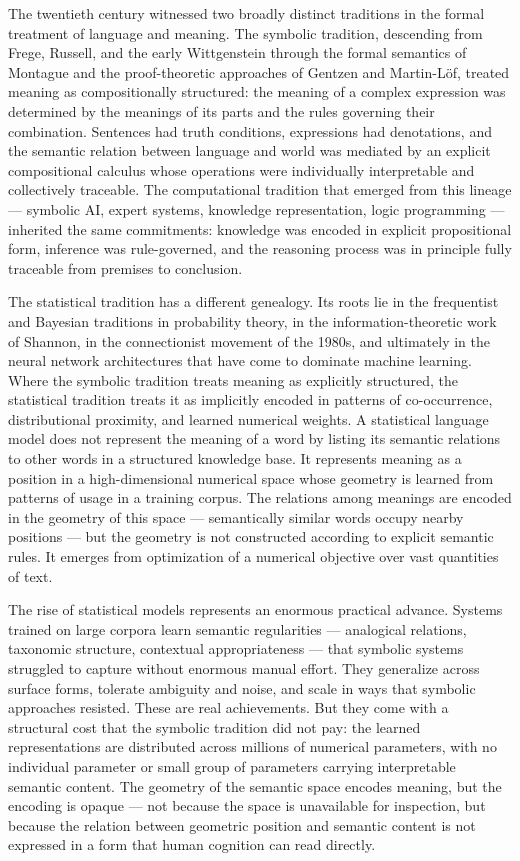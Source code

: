 \documentclass[12pt,openany]{book}
\theoremstyle{plain}
\theoremstyle{definition}
\theoremstyle{remark}
\begin{document}
The twentieth century witnessed two broadly distinct traditions in the formal treatment of language and meaning. The symbolic tradition, descending from Frege, Russell, and the early Wittgenstein through the formal semantics of Montague and the proof-theoretic approaches of Gentzen and Martin-Löf, treated meaning as compositionally structured: the meaning of a complex expression was determined by the meanings of its parts and the rules governing their combination. Sentences had truth conditions, expressions had denotations, and the semantic relation between language and world was mediated by an explicit compositional calculus whose operations were individually interpretable and collectively traceable. The computational tradition that emerged from this lineage — symbolic AI, expert systems, knowledge representation, logic programming — inherited the same commitments: knowledge was encoded in explicit propositional form, inference was rule-governed, and the reasoning process was in principle fully traceable from premises to conclusion.

The statistical tradition has a different genealogy. Its roots lie in the frequentist and Bayesian traditions in probability theory, in the information-theoretic work of Shannon, in the connectionist movement of the 1980s, and ultimately in the neural network architectures that have come to dominate machine learning. Where the symbolic tradition treats meaning as explicitly structured, the statistical tradition treats it as implicitly encoded in patterns of co-occurrence, distributional proximity, and learned numerical weights. A statistical language model does not represent the meaning of a word by listing its semantic relations to other words in a structured knowledge base. It represents meaning as a position in a high-dimensional numerical space whose geometry is learned from patterns of usage in a training corpus. The relations among meanings are encoded in the geometry of this space — semantically similar words occupy nearby positions — but the geometry is not constructed according to explicit semantic rules. It emerges from optimization of a numerical objective over vast quantities of text.

The rise of statistical models represents an enormous practical advance. Systems trained on large corpora learn semantic regularities — analogical relations, taxonomic structure, contextual appropriateness — that symbolic systems struggled to capture without enormous manual effort. They generalize across surface forms, tolerate ambiguity and noise, and scale in ways that symbolic approaches resisted. These are real achievements. But they come with a structural cost that the symbolic tradition did not pay: the learned representations are distributed across millions of numerical parameters, with no individual parameter or small group of parameters carrying interpretable semantic content. The geometry of the semantic space encodes meaning, but the encoding is opaque — not because the space is unavailable for inspection, but because the relation between geometric position and semantic content is not expressed in a form that human cognition can read directly.
\end{document}
